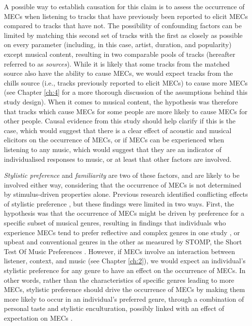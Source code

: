 A possible way to establish causation for this claim is to assess the occurrence of MECs when listening to tracks that have previously been reported to elicit MECs compared to tracks that have not. The possibility of confounding factors can be limited by matching this second set of tracks with the first as closely as possible on every parameter (including, in this case, artist, duration, and popularity) except musical content, resulting in two comparable pools of tracks (hereafter referred to as \emph{sources}). While it is likely that some tracks from the matched source also have the ability to cause MECs, we would expect tracks from the chills source (i.e., tracks previously reported to elicit MECs) to cause more MECs (see Chapter \ref{ch:4} for a more thorough discussion of the assumptions behind this study design). When it comes to musical content, the hypothesis was therefore that tracks which cause MECs for some people are more likely to cause MECs for other people. Causal evidence from this study should help clarify if this is the case, which would suggest that there is a clear effect of acoustic and musical elicitors on the occurrence of MECs, or if MECs can be experienced when listening to any music, which would suggest that they are an indicator of individualised responses to music, or at least that other factors are involved.

\emph{Stylistic preference} and \emph{familiarity} are two of these factors, and are likely to be involved either way, considering that the occurrence of MECs is not determined by stimulus-driven properties alone. Previous research identified conflicting effects of stylistic preference \parencite{bannister2018, nusbaum2011}, but these findings were limited in two ways. First, the hypothesis was that the occurrence of MECs might be driven by preference for a specific subset of musical genres, resulting in findings that individuals who experience MECs tend to prefer reflective and complex genres in one study \parencite{bannister2018}, or upbeat and conventional genres in the other \parencite{nusbaum2011} as measured by STOMP, the Short Test Of Music Preferences \parencite{rentfrow2003}. However, if MECs involve an interaction between listener, context, and music (see Chapter \ref{ch:2}), we would expect an individual's stylistic preference for any genre to have an effect on the occurrence of MECs. In other words, rather than the characteristics of specific genres leading to more MECs, stylistic preference should drive the occurrence of MECs by making them more likely to occur in an individual's preferred genre, through a combination of personal taste and stylistic enculturation, possibly linked with an effect of expectation on MECs \parencite[see][]{beier2020}. 

